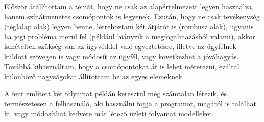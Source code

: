 Először átállítottam a témát, hogy ne csak az alapértelmezett legyen használva, hanem színátmenetes csomópontok is legyenek. Ezután, hogy ne csak tevékenység (téglalap alak) legyen benne, létrehoztam két átjárót is (rombusz alak), ugyanis ha jogi probléma merül fel (például hiányzik a megfogalmazásból valami), akkor ismételten szükség van az ügyvéddel való egyeztetésre, illetve az ügyfélnek küldött szövegen is vagy módosít az ügyfél, vagy következhet a jóváhagyás. Továbbá kihasználtam, hogy a csomópontokat át is lehet méretezni, ezáltal különböző nagyságokat állítottam be az egyes elemeknek.

A fent említett két folyamat példán keresztül még számtalan létezik, és természetesen a felhasználó, aki használni fogja a programot, magától is találhat ki, vagy módosíthat kedvére már létező üzleti folyamat modelleket.